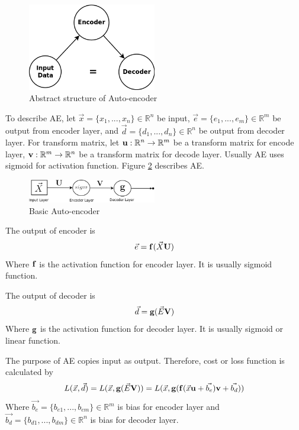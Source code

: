 \documentclass[draft,dvipsnames]{drexel-thesis}
\begin{document}
\begin{thesis}
\begin{figure}[t!]
    \centering
    \includegraphics[width=0.5\textwidth]{pictures/figures/AE.png}
    \caption{Abstract structure of Auto-encoder}
    \label{fig:AE}
\end{figure}

To describe AE, let $\vec{x} = \{x_1, ..., x_n\} \in \mathbb{R}^n$ be input, $\vec{e} = \{e_1, ..., e_m\} \in \mathbb{R}^m$ be output from encoder layer, and $\vec{d} = \{d_1, ..., d_n\} \in \mathbb{R}^n$ be output from decoder layer. For transform matrix, let $\bold{u}: \mathbb{R}^n \rightarrow \mathbb{R}^m$ be a transform matrix for encode layer, $\bold{v}: \mathbb{R}^m \rightarrow \mathbb{R}^n$ be a transform matrix for decode layer. Usually AE uses sigmoid for activation function. Figure \ref{fig:basic_AE} describes AE.

\begin{figure}[t!]
    \centering
    \includegraphics[width=0.5\textwidth]{pictures/figures/basic_AE.png}
    \caption{Basic Auto-encoder}
    \label{fig:basic_AE}
\end{figure}

The output of encoder is
$$\vec{e} = \bold{f}(\vec{X}\bold{U})$$
Where $\bold{f}$ is the activation function for encoder layer. It is usually sigmoid function.

The output of decoder is
$$\vec{d} = \bold{g}(\vec{E}\bold{V})$$
Where $\bold{g}$ is the activation function for decoder layer. It is usually sigmoid or linear function.

The purpose of AE copies input as output. Therefore, cost or loss function is calculated by
$$L(\vec{x}, \vec{d}) = L(\vec{x}, \bold{g}(\vec{E}\bold{V})) = L(\vec{x}, \bold{g}(\bold{f}(\vec{x}\bold{u}+\vec{b_e})\bold{v}+\vec{b_d}))$$
Where $\vec{b_e} = \{b_{e1}, ..., b_{em}\} \in \mathbb{R}^m$ is bias for encoder layer and $\vec{b_d} = \{b_{d1}, ..., b_{dm}\} \in \mathbb{R}^n$ is bias for decoder layer.


\end{thesis}
\end{document}
